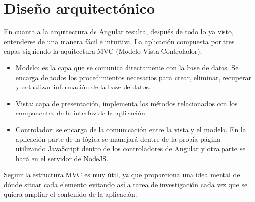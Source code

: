 \section{Diseño arquitectónico}\label{darquitectura}
En cuanto a la arquitectura de Angular resulta, después de todo lo ya visto, entenderse de una manera fácil e intuitiva. La aplicación compuesta por tres capas siguiendo la aquitectura MVC (Modelo-Vista-Controlador):
\begin{itemize}

\item \underline{Modelo}: es la capa que se comunica directamente con la base de datos. Se encarga de todos los procedimientos necesarios para crear, eliminar, recuperar y actualizar información de la base de datos.

\item \underline{Vista}: capa de presentación, implementa los métodos relacionados con los componentes de la interfaz de la aplicación.

 \item \underline{Controlador}: se encarga de la comunicación entre la vista y el modelo. En la aplicación parte de la lógica se manejará dentro de la propia página utilizando JavaScript dentro de los controladores de Angular y otra parte se hará en el servidor de NodeJS.
 


\end{itemize}


Seguir la estructura MVC es muy útil, ya que proporciona una idea mental de dónde situar cada elemento evitando así a tarea de investigación cada vez que se quiera ampliar el contenido de la aplicación.







